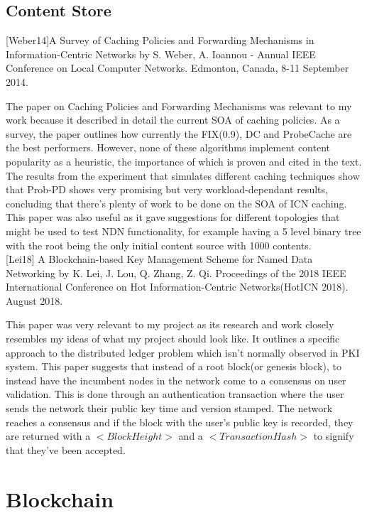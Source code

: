 \subsection{Content Store}
[Weber14]A Survey of Caching Policies and Forwarding Mechanisms in Information-Centric Networks by S. Weber, A. Ioannou -  Annual IEEE Conference on Local Computer Networks. Edmonton, Canada, 8-11 September 2014.

The paper on Caching Policies and Forwarding Mechanisms was relevant to my work because it described in detail the current SOA of caching policies. As a survey, the paper outlines how currently the FIX(0.9), DC and ProbeCache are the best performers. However, none of these algorithms implement content popularity as a heuristic, the importance of which is proven and cited in the text. The results from the experiment that simulates different caching techniques show that Prob-PD shows very promising but very workload-dependant results, concluding that there’s plenty of work to be done on the SOA of ICN caching. This paper was also useful as it gave suggestions for different topologies that might be used to test NDN functionality, for example having a 5 level binary tree with the root being the only initial content source with 1000 contents. 
\\


[Lei18] A Blockchain-based Key Management Scheme for Named Data Networking by K. Lei, J. Lou, Q. Zhang, Z. Qi. Proceedings of the  2018 IEEE International Conference on Hot Information-Centric Networks(HotICN 2018). August 2018.

This paper was very relevant to my project as its research and work closely resembles my ideas of what my project should look like. It outlines a specific approach to the distributed ledger problem which isn't normally observed in PKI system. This paper suggests that instead of a root block(or genesis block), to instead have the incumbent nodes in the network come to a consensus on user validation. This is done through an authentication transaction where the user sends the network their public key time and version stamped. The network reaches a consensus and if the block with the user's public key is recorded, they are returned with a ${<}Block Height{>}$ and a ${<}Transaction Hash{>}$ to signify that they've been accepted.


\section{Blockchain}

